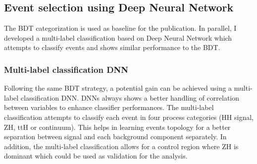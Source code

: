 \subsection{Event selection using Deep Neural Network}
\label{HHyybb:ObjEvt:DNN}

The BDT categorization is used as baseline for the publication. In parallel, I developed a multi-label classification based on Deep Neural Network which attempts to classify events and shows similar performance to the BDT. 
\subsubsection{Multi-label classification DNN}
Following the same BDT strategy, a potential gain can be achieved using a multi-label classification DNN. DNNs always shows a better handling of correlation between variables to enhance classifier performances. The multi-label classification attempts to classify each event in four process categories (HH signal, ZH, ttH or continuum). This helps in learning events topology for a better separation between signal and each background component separately. In addition, the multi-label classification allows for a control region where ZH is dominant which could be used as validation for the \HHyybb analysis. \\

